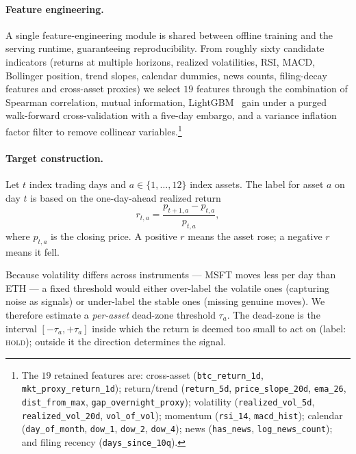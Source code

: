 \documentclass[runningheads]{llncs}
\begin{document}
\paragraph{Feature engineering.}
A single feature-engineering module is shared between offline training and the
serving runtime, guaranteeing reproducibility. From roughly sixty candidate
indicators (returns at multiple horizons, realized volatilities, RSI, MACD,
Bollinger position, trend slopes, calendar dummies, news counts, filing-decay
features and cross-asset proxies) we select $19$ features through the combination
of Spearman correlation, mutual information, LightGBM~\cite{ke2017} gain under a
purged walk-forward cross-validation with a five-day embargo, and a variance
inflation factor filter to remove collinear variables.\footnote{The $19$
retained features are: cross-asset (\texttt{btc\_return\_1d},
\texttt{mkt\_proxy\_return\_1d}); return/trend (\texttt{return\_5d},
\texttt{price\_slope\_20d}, \texttt{ema\_26}, \texttt{dist\_from\_max},
\texttt{gap\_overnight\_proxy}); volatility (\texttt{realized\_vol\_5d},
\texttt{realized\_vol\_20d}, \texttt{vol\_of\_vol}); momentum
(\texttt{rsi\_14}, \texttt{macd\_hist}); calendar (\texttt{day\_of\_month},
\texttt{dow\_1}, \texttt{dow\_2}, \texttt{dow\_4}); news (\texttt{has\_news},
\texttt{log\_news\_count}); and filing recency (\texttt{days\_since\_10q}).}

\paragraph{Target construction.}
Let $t$ index trading days and $a \in \{1,\dots,12\}$ index assets. The label
for asset $a$ on day $t$ is based on the one-day-ahead realized return
\begin{equation}
r_{t,a} = \frac{p_{t+1,a} - p_{t,a}}{p_{t,a}},
\end{equation}
where $p_{t,a}$ is the closing price. A positive $r$ means the asset rose; a
negative $r$ means it fell.

Because volatility differs across instruments --- MSFT moves less per day than
ETH --- a fixed threshold would either over-label the volatile ones (capturing
noise as signals) or under-label the stable ones (missing genuine moves). We
therefore estimate a \emph{per-asset} dead-zone threshold $\tau_a$. The
dead-zone is the interval $[-\tau_a, +\tau_a]$ inside which the return is
deemed too small to act on (label: \textsc{hold}); outside it the direction
determines the signal.
\end{document}
